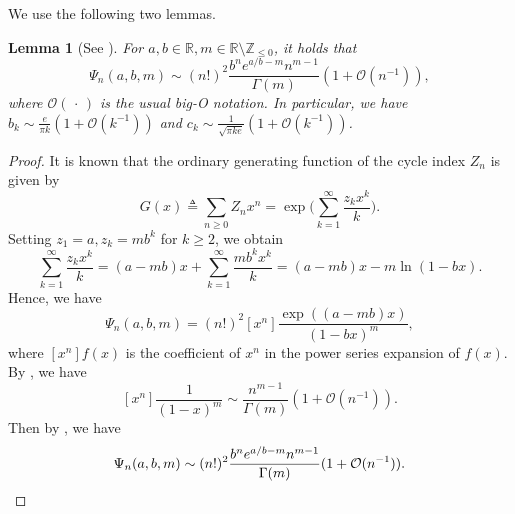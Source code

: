 \documentclass[conference]{IEEEtran}
\theoremstyle{plain}
\newtheorem{lem}[thm]{Lemma}
\theoremstyle{definition}
\providecommand{\Z}{\mathbb {Z}}
\providecommand{\R}{\mathbb {R}}
\newcommand{\RomanNumeralCaps}[1]{\MakeUppercase{\romannumeral #1}}
\newcommand{\defeq}{\triangleq}
\begin{document}
 We use the following two lemmas.

 \begin{lem}[See ]

  For $a,b\in \R, m\in\R\setminus\Z_{\leq0}$, it holds that
  \[\Psi_n(a,b,m)\sim
   (n!)^2\frac{b^ne^{a/b-m}n^{m-1}}{\Gamma(m)}(1+\mathcal O(n^{-1})),\]
  where $\mathcal O(\,\cdot\,)$ is the usual big-O notation. In particular, we
  have $b_k\sim\frac{e}{\pi k}(1+\mathcal O(k^{-1}))$ and
  $c_k\sim\frac{1}{\sqrt{\pi ke}}(1+\mathcal O(k^{-1}))$.
 \end{lem}
 \begin{proof}
  It is known that the ordinary generating function of the cycle index $Z_n$ is given by
  \[
   G(x)\defeq\sum_{n\geq 0}Z_nx^n
   =\exp\biggl(\sum_{k=1}^\infty \frac{z_kx^k}{k}\biggr).
  \]
  Setting $z_1=a,z_k=mb^k$ for $k\geq 2$, we obtain
  \[
   \sum_{k=1}^\infty \frac{z_kx^k}{k} = (a-mb)x +\sum_{k=1}^\infty \frac{mb^kx^k}{k} = (a-mb)x-m\ln(1-bx).
  \]
  Hence, we have \[\Psi_n(a,b,m)=(n!)^2[x^n]\frac{\exp((a-mb)x)}{(1-bx)^m},\]
  where $[x^n]f(x)$ is the coefficient of $x^n$ in the power series expansion
  of $f(x)$. By \cite[Thm.
  \RomanNumeralCaps{6}.1]{flajoletAnalyticCombinatorics2009}, we have
  \[[x^n]\frac{1}{(1-x)^{m}}\sim \frac{n^{m-1}}{\Gamma(m)}(1+\mathcal{O}(n^{-1})).\]
  Then by \cite[Sec. \RomanNumeralCaps{6}.3 \&
  4]{flajoletAnalyticCombinatorics2009}, we have
  \[
   \Psi_n(a,b,m)\sim(n!)^2\frac{b^ne^{a/b-m}n^{m-1}}{\Gamma(m)}(1+\mathcal O(n^{-1})). \qedhere
  \]
 \end{proof}
\end{document}
